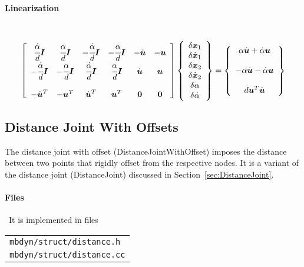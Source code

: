 \documentclass[10pt,dvips,fleqn]{report}
\newcommand{\T}[1]{\boldsymbol{#1}}
\begin{document}
\paragraph{Linearization} \
\begin{equation}
        \sqbr{\matr{cccccc}{
		\cfrac{\dot{\alpha}}{d}\T{I} & \cfrac{\alpha}{d}\T{I} &
			-\cfrac{\dot{\alpha}}{d}\T{I} & -\cfrac{\alpha}{d}\T{I} &
			-\dot{\T{u}} & -\T{u} \\
		-\cfrac{\dot{\alpha}}{d}\T{I} & -\cfrac{\alpha}{d}\T{I} &
			\cfrac{\dot{\alpha}}{d}\T{I} & \cfrac{\alpha}{d}\T{I} &
			\dot{\T{u}} & \T{u} \\
		\\
		-\dot{\T{u}}^T & -\T{u}^T & \dot{\T{u}}^T & \T{u}^T & \T{0} & \T{0}
	}}\cubr{\cvvect{
		\delta\T{x}_1 \\
		\delta\dot{\T{x}}_1 \\
		\delta\T{x}_2 \\
		\delta\dot{\T{x}}_2 \\
		\delta\alpha \\
		\delta\dot{\alpha}
	}} = \cubr{\cvvect{
		\alpha \dot{\T{u}} + \dot{\alpha} \T{u} \\
		\\
		-\alpha \dot{\T{u}} - \dot{\alpha} \T{u} \\
		\\
		d \T{u}^T \dot{\T{u}}
	}}
\end{equation}




\subsection{Distance Joint With Offsets}
\label{sec:DistanceJointWithOffset}
The distance joint with offset (DistanceJointWithOffset) 
imposes the distance between two points
that rigidly offset from the respective nodes.
It is a variant of the distance joint (DistanceJoint)
discussed in Section~\ref{sec:DistanceJoint}.

\paragraph{Files} \
It is implemented in files

\begin{tabular}{l}
\texttt{mbdyn/struct/distance.h} \\
\texttt{mbdyn/struct/distance.cc}
\end{tabular}
\end{document}
